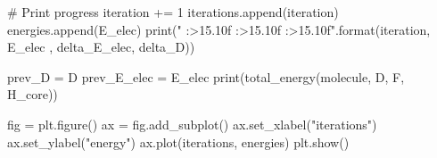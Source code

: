 \documentclass{beamer}
\begin{document}
    \begin{frame}[fragile]
        \begin{python}
            # Print progress
            iteration += 1
            iterations.append(iteration)
            energies.append(E_elec)
            print("{} {:>15.10f} {:>15.10f} {:>15.10f}".format(iteration, E_elec , delta_E_elec, delta_D))
        
            prev_D = D
            prev_E_elec = E_elec
        print(total_energy(molecule, D, F, H_core))
    \end{python}
\end{frame}
\begin{frame}[fragile]
    \begin{python}        
        fig = plt.figure()
        ax = fig.add_subplot()
        ax.set_xlabel("iterations")
        ax.set_ylabel("energy")
        ax.plot(iterations, energies)
        plt.show()

    \end{python}
\end{frame}
\end{document}
